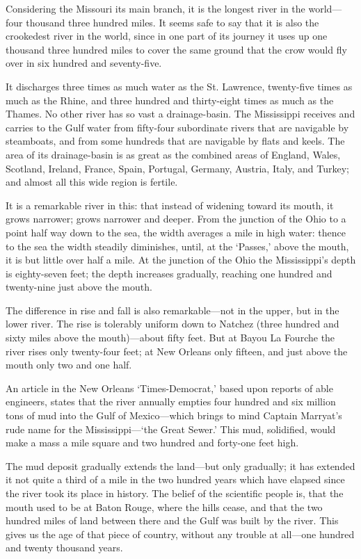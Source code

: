 \documentclass{novelette} %
\begin{document}
Considering the
Missouri its main branch, it is the longest river in the world---four
thousand three hundred miles. It seems safe to say that it is also the
crookedest river in the world, since in one part of its journey it uses
up one thousand three hundred miles to cover the same ground that the
crow would fly over in six hundred and seventy-five.

It discharges three
times as much water as the St. Lawrence, twenty-five times as much
as the Rhine, and three hundred and thirty-eight times as much as the
Thames. No other river has so vast a drainage-basin. The
Mississippi receives and carries to the Gulf water from fifty-four
subordinate rivers that are navigable by steamboats, and from some
hundreds that are navigable by flats and keels. The area of its
drainage-basin is as great as the combined areas of England, Wales,
Scotland, Ireland, France, Spain, Portugal, Germany, Austria, Italy,
and Turkey; and almost all this wide region is fertile.

It is a remarkable river in this: that instead of widening toward its
mouth, it grows narrower; grows narrower and deeper. From the junction
of the Ohio to a point half way down to the sea, the width averages a
mile in high water: thence to the sea the width steadily diminishes,
until, at the `Passes,' above the mouth, it is but little over half
a mile. At the junction of the Ohio the Mississippi's depth is
eighty-seven feet; the depth increases gradually, reaching one hundred
and twenty-nine just above the mouth.

The difference in rise and fall is also remarkable---not in the upper,
but in the lower river. The rise is tolerably uniform down to Natchez
(three hundred and sixty miles above the mouth)---about fifty feet.
But at Bayou La Fourche the river rises only twenty-four feet; at New
Orleans only fifteen, and just above the mouth only two and one half.

An article in the New Orleans `Times-Democrat,' based upon reports of
able engineers, states that the river annually empties four hundred and
six million tons of mud into the Gulf of Mexico---which brings to mind
Captain Marryat's rude name for the Mississippi---`the Great Sewer.' This
mud, solidified, would make a mass a mile square and two hundred and
forty-one feet high.

The mud deposit gradually extends the land---but only gradually; it has
extended it not quite a third of a mile in the two hundred years which
have elapsed since the river took its place in history. The belief of
the scientific people is, that the mouth used to be at Baton Rouge,
where the hills cease, and that the two hundred miles of land between
there and the Gulf was built by the river. This gives us the age of that
piece of country, without any trouble at all---one hundred and twenty
thousand years.
\end{document}
